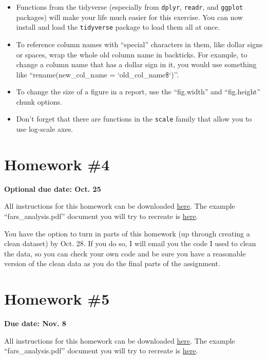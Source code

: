 \documentclass[]{book}
\providecommand{\tightlist}{%
  \setlength{\itemsep}{0pt}\setlength{\parskip}{0pt}}
\theoremstyle{definition}
\theoremstyle{definition}
\theoremstyle{definition}
\theoremstyle{remark}
\begin{document}
\begin{itemize}
\tightlist
\item
  Functions from the tidyverse (especially from \texttt{dplyr},
  \texttt{readr}, and \texttt{ggplot} packages) will make your life much
  easier for this exercise. You can now install and load the
  \texttt{tidyverse} package to load them all at once.
\item
  To reference column names with ``special'' characters in them, like
  dollar signs or spaces, wrap the whole old column name in backticks.
  For example, to change a column name that has a dollar sign in it, you
  would use something like ``rename(new\_col\_name =
  `old\_col\_name\$`)''.
\item
  To change the size of a figure in a report, use the ``fig.width'' and
  ``fig.height'' chunk options.
\item
  Don't forget that there are functions in the \texttt{scale} family
  that allow you to use log-scale axes.
\end{itemize}

\section{Homework \#4}\label{homework-4}

\textbf{Optional due date: Oct. 25}

All instructions for this homework can be downloaded
\href{https://github.com/geanders/RProgrammingForResearch/raw/master/Homework/Homework4and5.pdf}{here}.
The example ``fars\_analysis.pdf'' document you will try to recreate is
\href{https://github.com/geanders/RProgrammingForResearch/raw/master/Homework/fars_analysis.pdf}{here}.

You have the option to turn in parts of this homework (up through
creating a clean dataset) by Oct. 28. If you do so, I will email you the
code I used to clean the data, so you can check your own code and be
sure you have a reasonable version of the clean data as you do the final
parts of the assignment.

\section{Homework \#5}\label{homework-5}

\textbf{Due date: Nov. 8}

All instructions for this homework can be downloaded
\href{https://github.com/geanders/RProgrammingForResearch/raw/master/Homework/Homework4and5.pdf}{here}.
The example ``fars\_analysis.pdf'' document you will try to recreate is
\href{https://github.com/geanders/RProgrammingForResearch/raw/master/Homework/fars_analysis.pdf}{here}.
\end{document}
